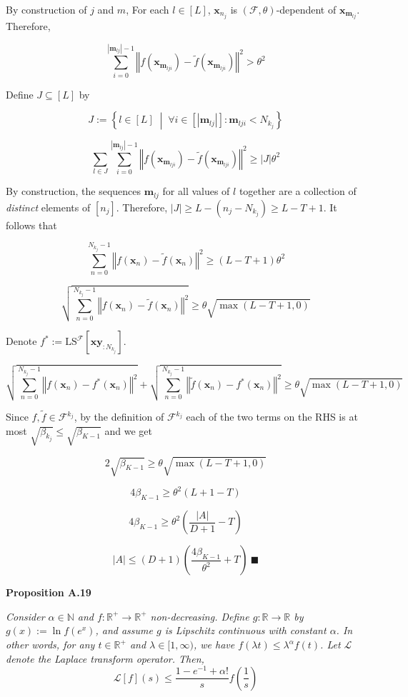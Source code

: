 \documentclass[a4paper]{article}
\newcommand{\Co}[1]{}
\newcommand{\AP}[1]{\left(#1\right)}
\newcommand{\AB}[1]{\left[#1\right]}
\newcommand{\ACM}[2]{\left\{#1\;\middle\vert\;#2\right\}}
\newcommand{\Abs}[1]{\left\vert #1 \right\vert}
\newcommand{\Norm}[1]{\left\Vert #1 \right\Vert}
\newcommand{\Nats}{\mathbb{N}}
\newcommand{\Reals}{\mathbb{R}}
\newcommand{\La}{\mathcal{L}}
\newcommand{\F}{\mathcal{F}}
\newcommand{\LS}{\mathrm{LS}}
\begin{document}
By construction of $j$ and $m$, For each $l\in[L]$, $\boldsymbol{x}_{n_j}$ is $(\F,\theta)$-dependent of $\boldsymbol{x}_{\boldsymbol{m}_{lj}}$. Therefore,

$$\sum_{i=0}^{\Abs{\boldsymbol{m}_{lj}}-1}\Norm{f\AP{\boldsymbol{x}_{\boldsymbol{m}_{lji}}}-\tilde{f}\AP{\boldsymbol{x}_{\boldsymbol{m}_{lji}}}}^2>\theta^2$$

Define $J\subseteq[L]$ by

$$J:=\ACM{l\in[L]}{\forall i\in\AB{\Abs{\boldsymbol{m}_{lj}}}: \boldsymbol{m}_{lji}<N_{k_j}}$$

$$\sum_{l\in J}\sum_{i=0}^{\Abs{\boldsymbol{m}_{lj}}-1}\Norm{f\AP{\boldsymbol{x}_{\boldsymbol{m}_{lji}}}-\tilde{f}\AP{\boldsymbol{x}_{\boldsymbol{m}_{lji}}}}^2\geq\Abs{J}\theta^2$$

By construction, the sequences $\boldsymbol{m}_{lj}$ for all values of $l$ together are a collection of \textit{distinct}\Co{i} elements of $\AB{n_j}$. Therefore, $\Abs{J}\geq L-\AP{n_j-N_{k_j}}\geq L-T+1$. It follows that

$$\sum_{n=0}^{N_{k_j}-1}\Norm{f\AP{\boldsymbol{x}_n}-\tilde{f}\AP{\boldsymbol{x}_n}}^2\geq(L-T+1)\theta^2$$

$$\sqrt{\sum_{n=0}^{N_{k_j}-1}\Norm{f\AP{\boldsymbol{x}_n}-\tilde{f}\AP{\boldsymbol{x}_n}}^2}\geq\theta\sqrt{\max(L-T+1,0)}$$

Denote $f^*:=\LS^\F\AB{\boldsymbol{xy}_{:N_{k_j}}}$.

$$\sqrt{\sum_{n=0}^{N_{k_j}-1}\Norm{f\AP{\boldsymbol{x}_n}-f^*\AP{\boldsymbol{x}_n}}^2}+\sqrt{\sum_{n=0}^{N_{k_j}-1}\Norm{\tilde{f}\AP{\boldsymbol{x}_n}-f^*\AP{\boldsymbol{x}_n}}^2}\geq\theta\sqrt{\max(L-T+1,0)}$$

Since $f,\tilde{f}\in\F^{k_j}$, by the definition of $\F^{k_j}$ each of the two terms on the RHS is at most $\sqrt{\beta_{k_j}}\leq\sqrt{\beta_{K-1}}$ and we get

$$2\sqrt{\beta_{K-1}} \geq\theta\sqrt{\max(L-T+1,0)}$$

$$4\beta_{K-1} \geq \theta^2(L+1-T)$$

$$4\beta_{K-1} \geq\theta^2\AP{\frac{\Abs{A}}{D+1}-T}$$

$$\Abs{A}\leq(D+1)\AP{\frac{4\beta_{K-1}}{\theta^2}+T}\ \blacksquare$$

\textbf{Proposition A.19}\Co{b}

\textit{Consider $\alpha\in\Nats$ and $f:\Reals^+\rightarrow\Reals^+$ non-decreasing. Define $g:\Reals\rightarrow\Reals$ by $g(x):=\ln{f\AP{e^x}}$, and assume $g$ is Lipschitz continuous with constant $\alpha$. In other words, for any $t\in\Reals^+$ and $\lambda\in[1,\infty)$, we have $f\AP{\lambda t}\leq\lambda^\alpha f(t)$. Let $\La$ denote the Laplace transform operator. Then,
}\Co{i}
$$\La[f](s)\leq\frac{1-e^{-1}+\alpha!}{s}f\AP{\frac{1}{s}}$$
\end{document}
